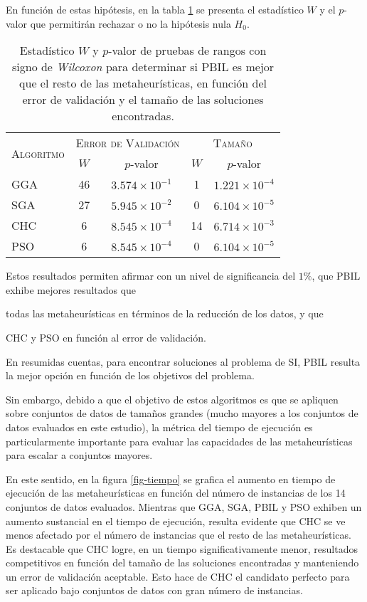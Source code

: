 En función de estas hipótesis, en la tabla \ref{wilcox-res-pbil} se presenta el estadístico $W$ y el $p$-valor que permitirán rechazar o no la hipótesis nula $H_0$.

\begin{table}[h!]
\centering
\begin{tabular}{l c c c c}
\hline
\multirow{2}{*}{\textsc{Algoritmo}}
	& \multicolumn{2}{c}{\textsc{Error de Validación}}
	& \multicolumn{2}{c}{\textsc{Tamaño}} \\\cline{2-5}
 & $W$ & $p$-valor & $W$ & $p$-valor \\
\hline
\hline
GGA & 46 & $3.574 \times 10^{-1}$ &  1 & $1.221 \times 10^{-4}$ \\
SGA & 27 & $5.945 \times 10^{-2}$ &  0 & $6.104 \times 10^{-5}$ \\
CHC &  6 & $8.545 \times 10^{-4}$ & 14 & $6.714 \times 10^{-3}$ \\
PSO &  6 & $8.545 \times 10^{-4}$ &  0 & $6.104 \times 10^{-5}$ \\
\hline
\end{tabular}
\caption[Pruebas de \emph{Wilcoxon} comparando PBIL]{Estadístico $W$ y $p$-valor de pruebas de rangos con signo de \emph{Wilcoxon} para determinar si PBIL es mejor que el resto de las metaheurísticas, en función del error de validación y el tamaño de las soluciones encontradas.}
\label{wilcox-res-pbil}
\end{table}

Estos resultados permiten afirmar con un nivel de significancia del $1\%$, que PBIL exhibe mejores resultados que
\begin{inparaenum}
\item todas las metaheurísticas en términos de la reducción de los datos, y que
\item CHC y PSO en función al error de validación.
\end{inparaenum}
En resumidas cuentas, para encontrar soluciones al problema de SI, PBIL resulta la mejor opción en función de los objetivos del problema.

Sin embargo, debido a que el objetivo de estos algoritmos es que se apliquen sobre conjuntos de datos de tamaños grandes (mucho mayores a los conjuntos de datos evaluados en este estudio), la métrica del tiempo de ejecución es particularmente importante para evaluar las capacidades de las metaheurísticas para escalar a conjuntos mayores.

En este sentido, en la figura \ref{fig-tiempo} se grafica el aumento en tiempo de ejecución de las metaheurísticas en función del número de instancias de los 14 conjuntos de datos evaluados. Mientras que GGA, SGA, PBIL y PSO exhiben un aumento sustancial en el tiempo de ejecución, resulta evidente que CHC se ve menos afectado por el número de instancias que el resto de las metaheurísticas. Es destacable que CHC logre, en un tiempo significativamente menor, resultados competitivos en función del tamaño de las soluciones encontradas y manteniendo un error de validación aceptable. Esto hace de CHC el candidato perfecto para ser aplicado bajo conjuntos de datos con gran número de instancias.

